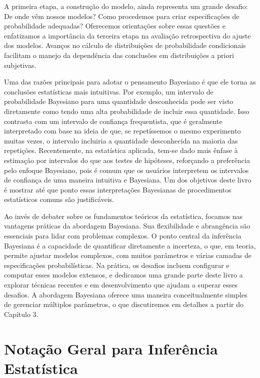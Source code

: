 A primeira etapa, a construção do modelo, ainda representa um grande desafio: De onde vêm nossos modelos? Como procedemos para criar especificações de probabilidade adequadas? Oferecemos orientações sobre essas questões e enfatizamos a importância da terceira etapa na avaliação retrospectiva do ajuste dos modelos. Avanços no cálculo de distribuições de probabilidade condicionais facilitam o manejo da dependência das conclusões em distribuições a priori subjetivas.

Uma das razões principais para adotar o pensamento Bayesiano é que ele torna as conclusões estatísticas mais intuitivas. Por exemplo, um intervalo de probabilidade Bayesiano para uma quantidade desconhecida pode ser visto diretamente como tendo uma alta probabilidade de incluir essa quantidade. Isso contrasta com um intervalo de confiança frequentista, que é geralmente interpretado com base na ideia de que, se repetíssemos o mesmo experimento muitas vezes, o intervalo incluiria a quantidade desconhecida na maioria das repetições. Recentemente, na estatística aplicada, tem-se dado mais ênfase à estimação por intervalos do que aos testes de hipóteses, reforçando a preferência pelo enfoque Bayesiano, pois é comum que os usuários interpretem os intervalos de confiança de uma maneira intuitiva e Bayesiana. Um dos objetivos deste livro é mostrar até que ponto essas interpretações Bayesianas de procedimentos estatísticos comuns são justificáveis.

Ao invés de debater sobre os fundamentos teóricos da estatística, focamos nas vantagens práticas da abordagem Bayesiana. Sua flexibilidade e abrangência são essenciais para lidar com problemas complexos. O ponto central da inferência Bayesiana é a capacidade de quantificar diretamente a incerteza, o que, em teoria, permite ajustar modelos complexos, com muitos parâmetros e várias camadas de especificações probabilísticas. Na prática, os desafios incluem configurar e computar esses modelos extensos, e dedicamos uma grande parte deste livro a explorar técnicas recentes e em desenvolvimento que ajudam a superar esses desafios. A abordagem Bayesiana oferece uma maneira conceitualmente simples de gerenciar múltiplos parâmetros, o que discutiremos em detalhes a partir do Capítulo 3.

\section{Notação Geral para Inferência Estatística}

